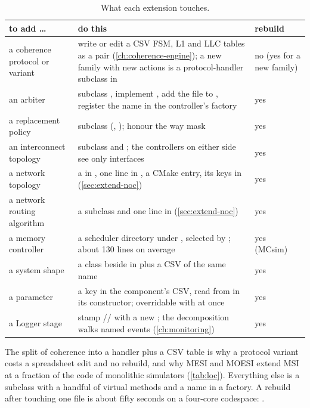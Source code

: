 \begin{table}[htbp]\centering\small
\caption{What each extension touches.}\label{tab:extend}
\begin{tabularx}{\textwidth}{@{}lYl@{}}
\toprule to add \ldots & do this & rebuild \\ \midrule
a coherence protocol or variant & write or edit a CSV FSM, L1 and LLC tables as a pair (\cref{ch:coherence-engine}); a new family with new actions is a protocol-handler subclass in  & no (yes for a new family) \\
an arbiter & subclass , implement , add the file to , register the name in the controller's factory & yes \\
a replacement policy & subclass  (, ); honour the way mask & yes \\
an interconnect topology & subclass  and ; the controllers on either side see only interfaces & yes \\
a network topology & a  in , one line in , a CMake entry, its keys in  (\cref{sec:extend-noc}) & yes \\
a network routing algorithm & a  subclass and one line in  (\cref{sec:extend-noc}) & yes \\
a memory controller & a scheduler directory under , selected by ; about 130 lines on average & yes (MCsim) \\
a system shape & a class beside  in  plus a CSV of the same name & yes \\
a parameter & a key in the component's CSV, read from  in its constructor; overridable with  at once & yes \\
a Logger stage & stamp // with a new ; the decomposition walks named events (\cref{ch:monitoring}) & yes \\
\bottomrule
\end{tabularx}
\end{table}

The split of coherence into a handler plus a CSV table is why a protocol variant costs a
spreadsheet edit and no rebuild, and why MESI and MOESI extend MSI at a fraction of the code of
monolithic simulators (\cref{tab:loc}). Everything else is a subclass with a handful of virtual
methods and a name in a factory. A rebuild after touching one file is about fifty seconds on a
four-core codespace: .

